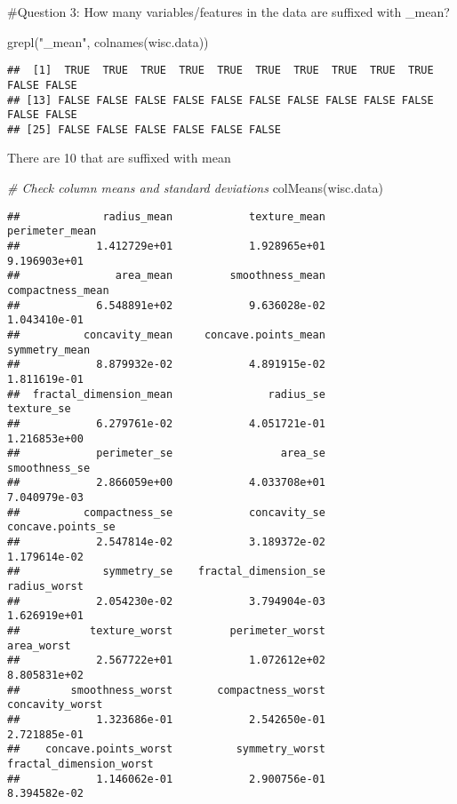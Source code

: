 \documentclass[
]{article}
\newenvironment{Shaded}{\begin{snugshade}}{\end{snugshade}}
\newcommand{\CommentTok}[1]{\textcolor[rgb]{0.56,0.35,0.01}{\textit{#1}}}
\newcommand{\FunctionTok}[1]{\textcolor[rgb]{0.00,0.00,0.00}{#1}}
\newcommand{\NormalTok}[1]{#1}
\newcommand{\StringTok}[1]{\textcolor[rgb]{0.31,0.60,0.02}{#1}}
\begin{document}
\#Question 3: How many variables/features in the data are suffixed with
\_mean?

\begin{Shaded}
\begin{Highlighting}[]
\FunctionTok{grepl}\NormalTok{(}\StringTok{"\_mean"}\NormalTok{, }\FunctionTok{colnames}\NormalTok{(wisc.data))}
\end{Highlighting}
\end{Shaded}

\begin{verbatim}
##  [1]  TRUE  TRUE  TRUE  TRUE  TRUE  TRUE  TRUE  TRUE  TRUE  TRUE FALSE FALSE
## [13] FALSE FALSE FALSE FALSE FALSE FALSE FALSE FALSE FALSE FALSE FALSE FALSE
## [25] FALSE FALSE FALSE FALSE FALSE FALSE
\end{verbatim}

There are 10 that are suffixed with mean

\begin{Shaded}
\begin{Highlighting}[]
\CommentTok{\# Check column means and standard deviations}
\FunctionTok{colMeans}\NormalTok{(wisc.data)}
\end{Highlighting}
\end{Shaded}

\begin{verbatim}
##             radius_mean            texture_mean          perimeter_mean 
##            1.412729e+01            1.928965e+01            9.196903e+01 
##               area_mean         smoothness_mean        compactness_mean 
##            6.548891e+02            9.636028e-02            1.043410e-01 
##          concavity_mean     concave.points_mean           symmetry_mean 
##            8.879932e-02            4.891915e-02            1.811619e-01 
##  fractal_dimension_mean               radius_se              texture_se 
##            6.279761e-02            4.051721e-01            1.216853e+00 
##            perimeter_se                 area_se           smoothness_se 
##            2.866059e+00            4.033708e+01            7.040979e-03 
##          compactness_se            concavity_se       concave.points_se 
##            2.547814e-02            3.189372e-02            1.179614e-02 
##             symmetry_se    fractal_dimension_se            radius_worst 
##            2.054230e-02            3.794904e-03            1.626919e+01 
##           texture_worst         perimeter_worst              area_worst 
##            2.567722e+01            1.072612e+02            8.805831e+02 
##        smoothness_worst       compactness_worst         concavity_worst 
##            1.323686e-01            2.542650e-01            2.721885e-01 
##    concave.points_worst          symmetry_worst fractal_dimension_worst 
##            1.146062e-01            2.900756e-01            8.394582e-02
\end{verbatim}
\end{document}
